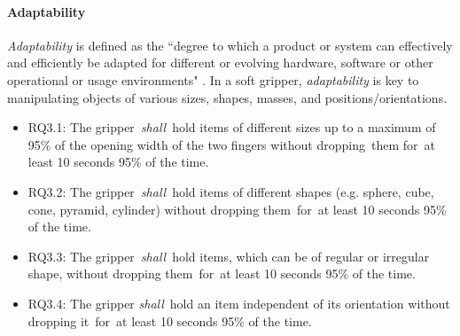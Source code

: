 \documentclass[lettersize,journal]{IEEEtran}
\begin{document}
\paragraph{Adaptability} \label{adaptability}
\emph{Adaptability} is defined as the ``degree to which a product or system can effectively and efficiently be adapted for different or evolving hardware, software or other operational or usage environments" \cite{ISO24765:2017}. In a soft gripper, \emph{adaptability} is key to manipulating objects of various sizes, shapes, masses, and positions/orientations. 
\begin{itemize}
	\item RQ3.1: The gripper \emph{shall} hold items of different sizes up to a maximum of 95\% of the opening width of the two fingers without dropping them for at least 10 seconds 95\% of the time.
	\item RQ3.2: The gripper \emph{shall} hold items of different shapes (e.g. sphere, cube, cone, pyramid, cylinder) without dropping them for at least 10 seconds 95\% of the time.
	\item RQ3.3: The gripper \emph{shall} hold items, which can be of regular or irregular shape, without dropping them for at least 10 seconds 95\% of the time.
	\item RQ3.4: The gripper \emph{shall} hold an item independent of its orientation without dropping it for at least 10 seconds 95\% of the time. 	  
\end{itemize}
%
%
\end{document}
